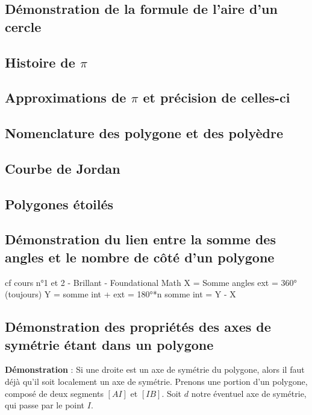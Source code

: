 \documentclass[a4paper, twoside]{article}
\begin{document}
\subsection*{Démonstration de la formule de l'aire d'un cercle} \label{demo_formule_aire_cercle}


\subsection*{Histoire de $\pi$} \label{histoire_de_pi}

\subsection*{Approximations de $\pi$ et précision de celles-ci} \label{approximations_pi}

\subsection*{Nomenclature des polygone et des polyèdre} \label{nomenclature_polygone_polyèdre}


\subsection*{Courbe de Jordan} \label{courbe_Jordan}

\subsection*{Polygones étoilés} \label{polygone_etoile}

\subsection*{Démonstration du lien entre la somme des angles et le nombre de côté d'un polygone} \label{demo_formule_lien_somme_angle_nb_cote}

cf cours n°1 et 2 - Brillant - Foundational Math
X = Somme angles ext = 360° (toujours)
Y = somme int + ext = 180°*n
somme int = Y - X


\subsection*{Démonstration des propriétés des axes de symétrie étant dans un polygone} \label{demo_axes_symétrie_polygone}

\textbf{Démonstration} : Si une droite est un axe de symétrie du polygone,
alors il faut déjà qu'il soit localement un axe de symétrie.
Prenons une portion d'un polygone, composé de deux segments $[AI]$ et $[IB]$.
Soit $d$ notre éventuel axe de symétrie, qui passe par le point $I$.
\end{document}
